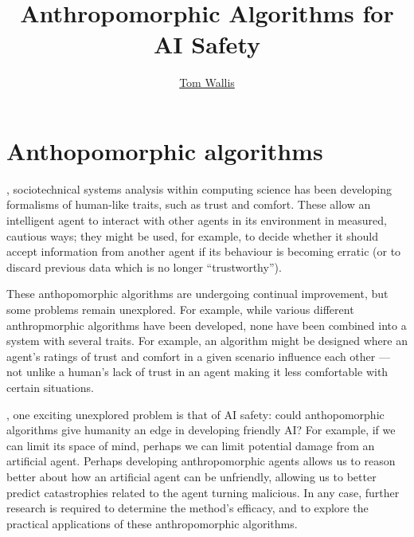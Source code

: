 
\title{Anthropomorphic Algorithms for AI Safety}
\author[Tom Wallis]{\href{http://tom.coffee}{Tom Wallis}}
\date{}



\maketitle

\section{Anthopomorphic algorithms}
, sociotechnical systems analysis within computing science has been developing formalisms of human-like traits, such as trust and comfort. These allow an intelligent agent to interact with other agents in its environment in measured, cautious ways; they might be used, for example, to decide whether it should accept information from another agent if its behaviour is becoming erratic (or to discard previous data which is no longer ``trustworthy''). \par

These anthopomorphic algorithms are undergoing continual improvement\cite{Kramdi}\cite{Urbano2014}, but some problems remain unexplored. For example, while various different anthropmorphic algorithms have been developed, none have been combined into a system with several traits. For example, an algorithm might be designed where an agent's ratings of trust and comfort in a given scenario influence each other --- not unlike a human's lack of trust in an agent making it less comfortable with certain situations.\par

, one exciting unexplored problem is that of AI safety: could anthopomorphic algorithms give humanity an edge in developing friendly AI\@? For example, if we can limit its space of mind\cite{shanahan, sloman_spaceofminds}, perhaps we can limit potential damage from an artificial agent. Perhaps developing anthropomorphic agents allows us to reason better about how an artificial agent can be unfriendly, allowing us to better predict catastrophies related to the agent turning malicious. In any case, further research is required to determine the method's efficacy, and to explore the practical applications of these anthropomorphic algorithms.\par

